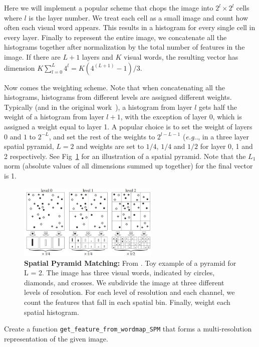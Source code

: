 \documentclass[11pt]{article}
\makeatletter
\numberwithin{equation}{section} %
\numberwithin{figure}{section} %
\numberwithin{table}{section} %
\DeclareRobustCommand\onedot{\futurelet\@let@token\@onedot}
\def\@onedot{\ifx\@let@token.\else.\null\fi\xspace}
\def\eg{\emph{e.g}\onedot} \def\Eg{\emph{E.g}\onedot}
\makeatother
\begin{document}
Here we will implement a popular scheme that chops the image into $2^l\times2^l$ cells where $l$ is the layer number. We treat each cell as a small image and count how often each visual word appears. This results in a histogram for every single cell in every layer. Finally to represent the entire image, we concatenate all the histograms together after normalization by the total number of features in the image. If there are $L+1$ layers and $K$ visual words, the resulting vector has dimension $K\sum_{l=0}^L{4^l} = K\left(4^{(L+1)}-1\right)/3$.

Now comes the weighting scheme. Note that when concatenating all the histograms, histograms from different levels are assigned different weights. Typically (and in the original work~\cite{1641019}), a histogram from layer $l$ gets half the weight of a histogram from layer $l+1$, with the exception of layer 0, which is assigned a weight equal to layer 1. A popular choice is to set the weight of layers $0$ and $1$ to $2^{-L}$, and set the rest of the weights to $2^{l-L-1}$ (\eg, in a three layer spatial pyramid, $L=2$ and weights are set to $1/4$, $1/4$ and $1/2$ for layer 0, 1 and 2 respectively. See Fig~\ref{fig:spm} for an illustration of a spatial pyramid. Note that the $L_1$ norm (absolute values of all dimensions summed up together) for the final vector is 1.

\begin{figure}[h]
\centering
\includegraphics[width=0.6\textwidth]{figures/spm.jpg}
\caption{{\bf Spatial Pyramid Matching:} From \cite{1641019}. Toy example of a pyramid for L = 2. The image has three visual words, indicated by circles, diamonds, and crosses. We subdivide
the image at three different levels of resolution. For each level of resolution
and each channel, we count the features that fall in each spatial bin. Finally, 
weight each spatial histogram.}
\label{fig:spm}
\end{figure}

\par {}
Create a function {\tt get\_feature\_from\_wordmap\_SPM} that forms a multi-resolution representation of the given image.
\end{document}
